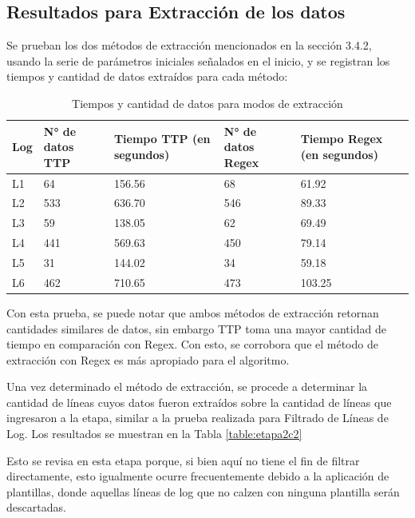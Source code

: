 \subsection{Resultados para Extracción de los datos}

Se prueban los dos métodos de extracción mencionados en la sección 3.4.2, usando la serie de parámetros iniciales señalados en el inicio, y se registran los tiempos y cantidad de datos extraídos para cada método:

\begin{table}[h]
    \centering
    \caption{\label{table:etapa2} Tiempos y cantidad de datos para modos de extracción}
    \begin{tabular}{|p{2cm}|p{3cm}|p{3cm}|p{3cm}|p{3cm}|}
        \hline
        Log & N° de datos TTP & Tiempo TTP (en segundos) & N° de datos Regex & Tiempo Regex (en segundos) \\
        \hline
        L1 & 64 & 156.56 & 68 & 61.92 \\
        \hline
        L2 & 533 & 636.70 & 546 & 89.33 \\
        \hline
        L3 & 59 & 138.05 & 62 & 69.49 \\
        \hline
        L4 & 441 & 569.63 & 450 & 79.14 \\
        \hline
        L5 & 31 & 144.02 & 34 & 59.18 \\
        \hline
        L6 & 462 & 710.65 & 473 & 103.25 \\
        \hline
    \end{tabular}
\end{table}

Con esta prueba, se puede notar que ambos métodos de extracción retornan cantidades similares de datos, sin embargo TTP toma una mayor cantidad de tiempo en comparación con Regex. Con esto, se corrobora que el método de extracción con Regex es más apropiado para el algoritmo.

Una vez determinado el método de extracción, se procede a determinar la cantidad de líneas cuyos datos fueron extraídos sobre la cantidad de líneas que ingresaron a la etapa, similar a la prueba realizada para Filtrado de Líneas de Log. Los resultados se muestran en la Tabla \ref{table:etapa2c2}

Esto se revisa en esta etapa porque, si bien aquí no tiene el fin de filtrar directamente, esto igualmente ocurre frecuentemente debido a la aplicación de plantillas, donde aquellas líneas de log que no calzen con ninguna plantilla serán descartadas.


